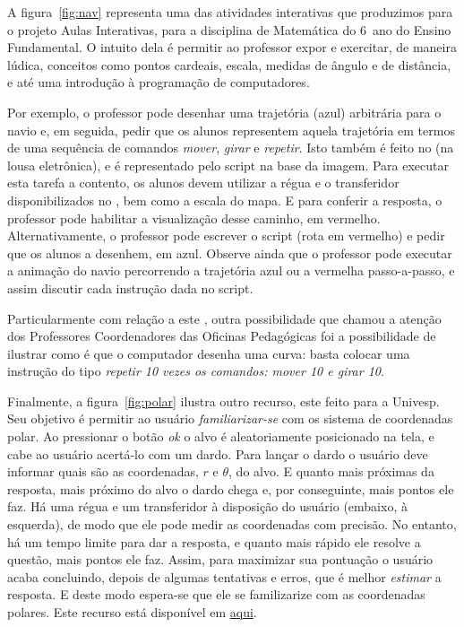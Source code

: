 	
	A figura~\ref{fig:nav} representa uma das atividades interativas que produzimos para o projeto Aulas Interativas, para a disciplina de Matemática do 6\textordmasculine\ ano do Ensino Fundamental. O intuito dela é permitir ao professor expor e exercitar, de maneira lúdica, conceitos como pontos cardeais, escala, medidas de ângulo e de distância, e até uma introdução à programação de computadores.
	
	Por exemplo, o professor pode desenhar uma trajetória (azul) arbitrária para o navio e, em seguida, pedir que os alunos representem aquela trajetória em termos de uma sequência de comandos \emph{mover}, \emph{girar} e \emph{repetir}. Isto também é feito no  (na lousa eletrônica), e é representado pelo script na base da imagem. Para executar esta tarefa a contento, os alunos devem utilizar a régua e o transferidor disponibilizados no , bem como a escala do mapa. E para conferir a resposta, o professor pode habilitar a visualização desse caminho, em vermelho. Alternativamente, o professor pode escrever o script (rota em vermelho) e pedir que os alunos a desenhem, em azul. Observe ainda que o professor pode executar a animação do navio percorrendo a trajetória azul ou a vermelha passo-a-passo, e assim discutir cada instrução dada no script.
	
	Particularmente com relação a este , outra possibilidade que chamou a atenção dos Professores Coordenadores das Oficinas Pedagógicas foi a possibilidade de ilustrar como é que o computador desenha uma curva: basta colocar uma instrução do tipo \emph{repetir 10 vezes os comandos: mover \unit{10}{\kilo\metre} e girar \unit{10}{\degree}}.
	
	Finalmente, a figura~\ref{fig:polar} ilustra outro recurso, este feito para a Univesp. Seu objetivo é permitir ao usuário \emph{familiarizar-se} com os sistema de coordenadas polar. Ao pressionar o botão \emph{ok} o alvo é aleatoriamente posicionado na tela, e cabe ao usuário acertá-lo com um dardo. Para lançar o dardo o usuário deve informar quais são as coordenadas, $r$ e $\theta$, do alvo. E quanto mais próximas da resposta, mais próximo do alvo o dardo chega e, por conseguinte, mais pontos ele faz. Há uma régua e um transferidor à disposição do usuário (embaixo, à esquerda), de modo que ele pode medir as coordenadas com precisão. No entanto, há um tempo limite para dar a resposta, e quanto mais rápido ele resolve a questão, mais pontos ele faz. Assim, para maximizar sua pontuação o usuário acaba concluindo, depois de algumas tentativas e erros, que é melhor \emph{estimar} a resposta. E deste modo espera-se que ele se familizarize com as coordenadas polares. Este recurso está disponível em \href{http://midia.atp.usp.br/atividades-interativas/AI-0001/}{aqui}.
	